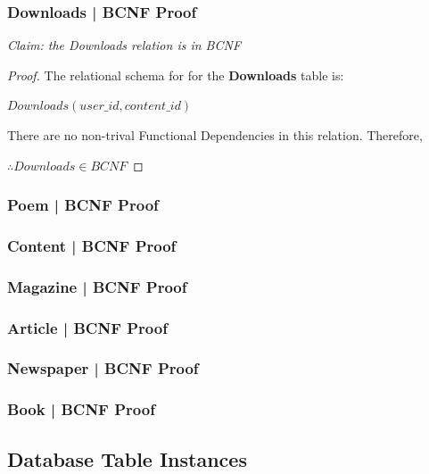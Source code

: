 \documentclass[letter, 12pt, titlepage]{article}
\begin{document}
		\subsubsection{Downloads | BCNF Proof }
		

		\textit{Claim: the Downloads relation is in BCNF}


		\begin{proof}
	
		The relational schema for for the \textbf{Downloads} table is:

		$Downloads(user\_id, content\_id)$

		There are no non-trival Functional Dependencies in this relation. Therefore,
			
		$\therefore Downloads \in BCNF $	

		\end{proof}

		\subsubsection{Poem | BCNF Proof }
		

		\subsubsection{Content | BCNF Proof }
		\subsubsection{Magazine | BCNF Proof }
		\subsubsection{Article | BCNF Proof }
		\subsubsection{Newspaper | BCNF Proof }
		\subsubsection{Book | BCNF Proof }
	
\subsection{Database Table Instances}
\end{document}

